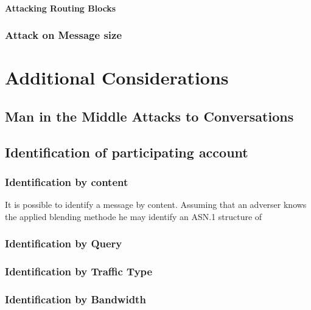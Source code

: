 \subsubsection{Attacking Routing Blocks}

\subsection{Attack on Message size}


\chapter{Additional Considerations}
\section{Man in the Middle Attacks to Conversations}


\section{Identification of participating account}


\subsection{Identification by content}
It is possible to identify a message by content. Assuming that an adverser knows the applied blending methode he may identify an ASN.1 structure of 


\subsection{Identification by Query}


\subsection{Identification by Traffic Type}


\subsection{Identification by Bandwidth}

